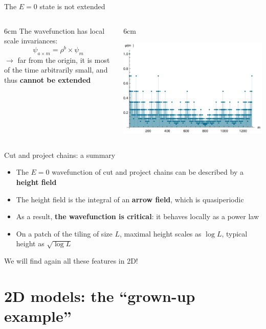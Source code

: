 \documentclass[xcolor=x11names,compress,professionalfonts]{beamer}
\renewcommand{\(}{\begin{columns}}
\renewcommand{\)}{\end{columns}}
\newcommand{\<}[1]{\begin{column}{#1}}
\renewcommand{\>}{\end{column}}
\begin{document}
\begin{frame}{The $E=0$ state is not extended}
{

\centering

}

\begin{columns}
\<{6cm}
The wavefunction has local scale invariances:
\[
	\psi_{a \times m} = \rho^b \times \psi_{m} 
\]
$\rightarrow$ far from the origin, it is most of the time arbitrarily small, and thus \textbf{cannot be extended}
\>

\<{6cm}
{\centering
\includegraphics[scale=.5]{img/wavefunction.pdf}

}
\>
\end{columns}

\end{frame}

\begin{frame}{Cut and project chains: a summary}
\begin{itemize}
	\item The $E=0$ wavefunction of cut and project chains can be described by a \textbf{height field}
	\item The height field is the integral of an \textbf{arrow field}, which is quasiperiodic
	\item As a result, \textbf{the wavefunction is critical}: it behaves locally as a power law
	\item On a patch of the tiling of size $L$, maximal height scales as $\log L$, typical height as $\sqrt{\log L}$
\end{itemize}
We will find again all these features in 2D!
\end{frame}

\section{2D models: the ``grown-up example''}
\end{document}
